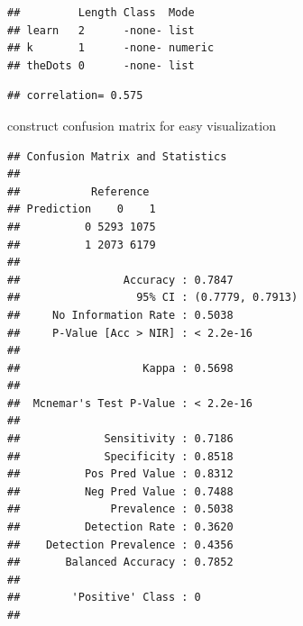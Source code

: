 \documentclass[
]{article}
\newenvironment{Shaded}{\begin{snugshade}}{\end{snugshade}}
\newcommand{\AttributeTok}[1]{\textcolor[rgb]{0.77,0.63,0.00}{#1}}
\newcommand{\DecValTok}[1]{\textcolor[rgb]{0.00,0.00,0.81}{#1}}
\newcommand{\FloatTok}[1]{\textcolor[rgb]{0.00,0.00,0.81}{#1}}
\newcommand{\FunctionTok}[1]{\textcolor[rgb]{0.00,0.00,0.00}{#1}}
\newcommand{\NormalTok}[1]{#1}
\newcommand{\OtherTok}[1]{\textcolor[rgb]{0.56,0.35,0.01}{#1}}
\newcommand{\SpecialCharTok}[1]{\textcolor[rgb]{0.00,0.00,0.00}{#1}}
\newcommand{\StringTok}[1]{\textcolor[rgb]{0.31,0.60,0.02}{#1}}
\begin{document}
\begin{verbatim}
##         Length Class  Mode   
## learn   2      -none- list   
## k       1      -none- numeric
## theDots 0      -none- list
\end{verbatim}

\begin{Shaded}
\end{Shaded}

\begin{verbatim}
## correlation= 0.575
\end{verbatim}

construct confusion matrix for easy visualization

\begin{Shaded}
\end{Shaded}

\begin{verbatim}
## Confusion Matrix and Statistics
## 
##           Reference
## Prediction    0    1
##          0 5293 1075
##          1 2073 6179
##                                           
##                Accuracy : 0.7847          
##                  95% CI : (0.7779, 0.7913)
##     No Information Rate : 0.5038          
##     P-Value [Acc > NIR] : < 2.2e-16       
##                                           
##                   Kappa : 0.5698          
##                                           
##  Mcnemar's Test P-Value : < 2.2e-16       
##                                           
##             Sensitivity : 0.7186          
##             Specificity : 0.8518          
##          Pos Pred Value : 0.8312          
##          Neg Pred Value : 0.7488          
##              Prevalence : 0.5038          
##          Detection Rate : 0.3620          
##    Detection Prevalence : 0.4356          
##       Balanced Accuracy : 0.7852          
##                                           
##        'Positive' Class : 0               
## 
\end{verbatim}
\end{document}
